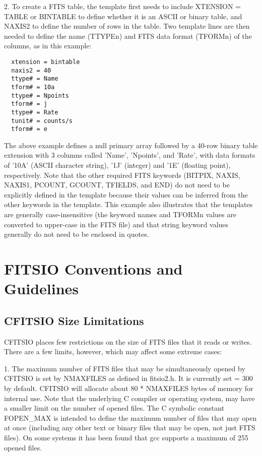 \documentclass[11pt]{book}
\begin{document}
2.  To create a FITS  table, the template first needs to include
XTENSION = TABLE or BINTABLE to define whether it is an ASCII or binary
table, and NAXIS2 to define the number of rows in the table.  Two
template lines are then needed to define the name (TTYPEn) and FITS data
format (TFORMn) of the columns, as in this example:

\begin{verbatim}
  xtension = bintable
  naxis2 = 40
  ttype# = Name
  tform# = 10a
  ttype# = Npoints
  tform# = j
  ttype# = Rate
  tunit# = counts/s
  tform# = e
\end{verbatim}
The above example defines a null primary array followed by a 40-row
binary table extension with 3 columns called 'Name', 'Npoints', and
'Rate', with data formats of '10A' (ASCII character string), '1J'
(integer) and '1E' (floating point), respectively.  Note that the other
required FITS keywords (BITPIX, NAXIS, NAXIS1, PCOUNT, GCOUNT, TFIELDS,
and END) do not need to be explicitly defined in the template because
their values can be inferred from the other keywords in the template.
This example also illustrates that the templates are generally
case-insensitive (the keyword names and TFORMn values are converted to
upper-case in the FITS file) and that string keyword values generally
do not need to be enclosed in quotes.

\chapter{FITSIO Conventions and Guidelines }


\section{CFITSIO Size Limitations}

CFITSIO places few restrictions on the size of FITS files that it
reads or writes.  There are a few limits, however, which may affect
some extreme cases:

1.  The maximum number of FITS files that may be simultaneously opened
by CFITSIO is set by NMAXFILES as defined in fitsio2.h.  It is currently
set = 300 by default.  CFITSIO will allocate about 80 * NMAXFILES bytes
of memory for internal use.  Note that the underlying C compiler or
operating system, may have a smaller limit on the number of opened files.
The C symbolic constant FOPEN\_MAX is intended to define the maximum
number of files that may open at once (including any other text or
binary files that may be open, not just FITS files).  On some systems it
has been found that gcc supports a maximum of 255 opened files.
\end{document}
